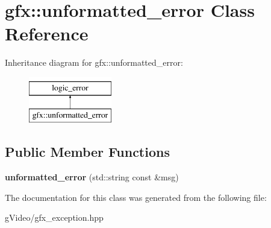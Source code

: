 \hypertarget{classgfx_1_1unformatted__error}{\section{gfx\-:\-:unformatted\-\_\-error Class Reference}
\label{classgfx_1_1unformatted__error}
}
Inheritance diagram for gfx\-:\-:unformatted\-\_\-error\-:\begin{figure}[H]
\begin{center}
\leavevmode
\includegraphics[height=2.000000cm]{classgfx_1_1unformatted__error}
\end{center}
\end{figure}
\subsection*{Public Member Functions}
\begin{DoxyCompactItemize}
\item 
\hypertarget{classgfx_1_1unformatted__error_a0b3d4b0c91ff63920993c78611f8eace}{{\bfseries unformatted\-\_\-error} (std\-::string const \&msg)}\label{classgfx_1_1unformatted__error_a0b3d4b0c91ff63920993c78611f8eace}

\end{DoxyCompactItemize}


The documentation for this class was generated from the following file\-:\begin{DoxyCompactItemize}
\item 
g\-Video/gfx\-\_\-exception.\-hpp\end{DoxyCompactItemize}
